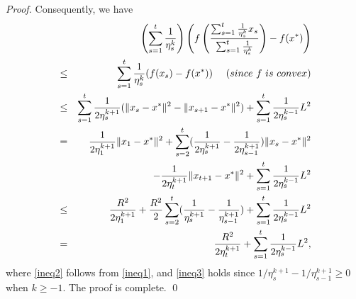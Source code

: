 \documentclass[10pt,a4paper]{amsart}
\begin{document}
\begin{proof}
Consequently, we have
	\begin{eqnarray}
&&\left(\sum_{s=1}^t\frac{1}{\eta_s^k}\right)\left(		f\left(\frac{\sum_{s=1}^t \frac{1}{\eta_s^k}x_s}{\sum_{s=1}^t \frac{1}{\eta_s^k}}\right)-f(x^*)\right) \nonumber \\
&\le&	\sum_{s=1}^t\frac{1}{\eta_s^k}(f(x_s)-f(x^*))  ~~~~({\rm since~}f{\rm~is~convex})\nonumber\\
&\le& \sum_{s=1}^t\frac{1}{2\eta_s^{k+1}}(\Vert x_s-x^* \Vert^2-\Vert x_{s+1}-x^* \Vert^2)+\sum_{s=1}^t\frac{1}{2\eta_s^{k-1}}L^2 \label{ineq2}\\
			&=& \frac{1}{2\eta_1^{k+1}}\Vert x_1-x^* \Vert^2+\sum_{s=2}^t(\frac{1}{2\eta_s^{k+1}}-\frac{1}{2\eta_{s-1}^{k+1}})\Vert x_s-x^* \Vert^2 \nonumber\\
&&-\frac{1}{2\eta_{t}^{k+1}}\Vert x_{t+1}-x^* \Vert^2+\sum_{s=1}^t\frac{1}{2\eta_s^{k-1}}L^2\nonumber\\
			&\le& \frac{R^2}{2\eta_1^{k+1}}+\frac{R^2}{2}\sum_{s=2}^t(\frac{1}{\eta_s^{k+1}}-\frac{1}{\eta_{s-1}^{k+1}})+
\sum_{s=1}^t\frac{1}{2\eta_s^{k-1}}L^2\label{ineq3}\\
			&=& \frac{R^2}{2\eta_t^{k+1}}+\sum_{s=1}^t\frac{1}{2\eta_s^{k-1}}L^2,\nonumber
		 \end{eqnarray}
where \eqref{ineq2} follows from \eqref{ineq1}, and \eqref{ineq3} holds since $1/\eta_s^{k+1}-1/\eta_{s-1}^{k+1}\ge0$ when $k\ge -1$. The proof is complete.  \qed
\end{proof}	
\end{document}
